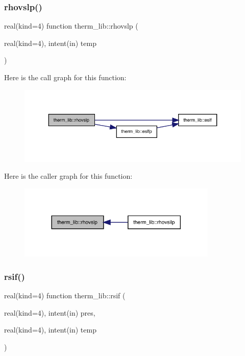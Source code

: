 \subsubsection{\texorpdfstring{rhovslp()}{rhovslp()}}
{\footnotesize\ttfamily real(kind=4) function therm\+\_\+lib\+::rhovslp (\begin{DoxyParamCaption}\item[{real(kind=4), intent(in)}]{temp }\end{DoxyParamCaption})}

Here is the call graph for this function\+:
\nopagebreak
\begin{figure}[H]
\begin{center}
\leavevmode
\includegraphics[width=350pt]{namespacetherm__lib_a47c1103775af2f781f2fabf678217375_cgraph}
\end{center}
\end{figure}
Here is the caller graph for this function\+:
\nopagebreak
\begin{figure}[H]
\begin{center}
\leavevmode
\includegraphics[width=269pt]{namespacetherm__lib_a47c1103775af2f781f2fabf678217375_icgraph}
\end{center}
\end{figure}
\mbox{\label{namespacetherm__lib_a16031b6116a46111467e9923e566dd49}} 
\subsubsection{\texorpdfstring{rsif()}{rsif()}}
{\footnotesize\ttfamily real(kind=4) function therm\+\_\+lib\+::rsif (\begin{DoxyParamCaption}\item[{real(kind=4), intent(in)}]{pres,  }\item[{real(kind=4), intent(in)}]{temp }\end{DoxyParamCaption})}

